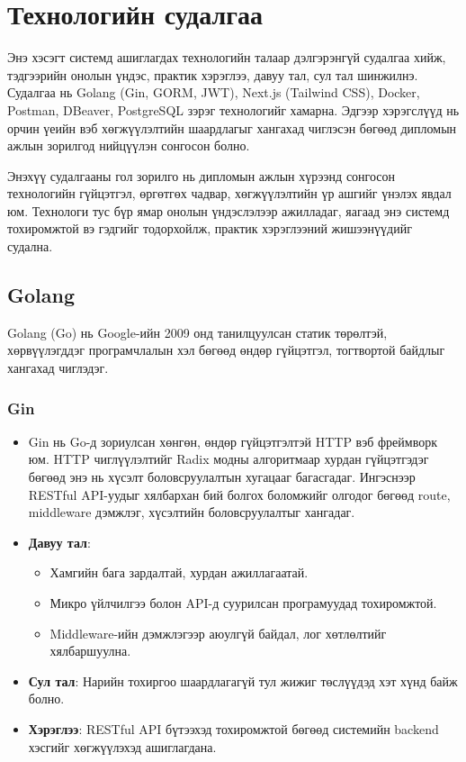 


\section{Технологийн судалгаа}
Энэ хэсэгт системд ашиглагдах технологийн талаар дэлгэрэнгүй судалгаа хийж, тэдгээрийн онолын үндэс, практик хэрэглээ, давуу тал, сул тал шинжилнэ. Судалгаа нь Golang (Gin, GORM, JWT), Next.js (Tailwind CSS), Docker, Postman, DBeaver, PostgreSQL зэрэг технологийг хамарна. Эдгээр хэрэгслүүд нь орчин үеийн вэб хөгжүүлэлтийн шаардлагыг хангахад чиглэсэн бөгөөд дипломын ажлын зорилгод нийцүүлэн сонгосон болно.

Энэхүү судалгааны гол зорилго нь дипломын ажлын хүрээнд сонгосон технологийн гүйцэтгэл, өргөтгөх чадвар, хөгжүүлэлтийн үр ашгийг үнэлэх явдал юм. Технологи тус бүр ямар онолын үндэслэлээр ажилладаг, яагаад энэ системд тохиромжтой вэ гэдгийг тодорхойлж, практик хэрэглээний жишээнүүдийг судална.

\subsection{Golang}
Golang (Go) нь Google-ийн 2009 онд танилцуулсан статик төрөлтэй, хөрвүүлэгддэг програмчлалын хэл бөгөөд өндөр гүйцэтгэл, тогтвортой байдлыг хангахад чиглэдэг.

\subsubsection{Gin}
\begin{itemize}
    \item Gin нь Go-д зориулсан хөнгөн, өндөр гүйцэтгэлтэй HTTP вэб фреймворк юм. HTTP чиглүүлэлтийг Radix модны алгоритмаар хурдан гүйцэтгэдэг бөгөөд энэ нь хүсэлт боловсруулалтын хугацааг багасгадаг. Ингэснээр RESTful API-уудыг хялбархан бий болгох боломжийг олгодог бөгөөд route, middleware дэмжлэг, хүсэлтийн боловсруулалтыг хангадаг.
    \item \textbf{Давуу тал}: 
    \begin{itemize}
        \item Хамгийн бага зардалтай, хурдан ажиллагаатай.
        \item Микро үйлчилгээ болон API-д суурилсан програмуудад тохиромжтой.
        \item Middleware-ийн дэмжлэгээр аюулгүй байдал, лог хөтлөлтийг хялбаршуулна.
    \end{itemize}
    \item \textbf{Сул тал}: Нарийн тохиргоо шаардлагагүй тул жижиг төслүүдэд хэт хүнд байж болно.
    \item \textbf{Хэрэглээ}: RESTful API бүтээхэд тохиромжтой бөгөөд системийн backend хэсгийг хөгжүүлэхэд ашиглагдана.
\end{itemize}

